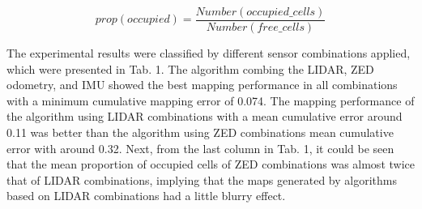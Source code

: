 \documentclass[english]{article}
\begin{document}
\begin{equation}
prop\left(occupied\right)=\frac{Number\left(occupied\_cells\right)}{Number\left(free\_cells\right)}
    \label{eq:eq3}
\end{equation}

The experimental results were classified by different sensor combinations applied, which were presented in
Tab. 1. The algorithm combing the LIDAR, ZED odometry, and IMU showed the best mapping performance in
all combinations with a minimum cumulative mapping error of 0.074. The mapping performance of the algorithm
using LIDAR combinations with a mean cumulative error around 0.11 was better than the algorithm using ZED
combinations mean cumulative error with around 0.32. Next, from the last column in Tab. 1, it could be seen
that the mean proportion of occupied cells of ZED combinations was almost twice that of LIDAR combinations,
implying that the maps generated by algorithms based on LIDAR combinations had a little blurry effect.

{\small


}
\end{document}
